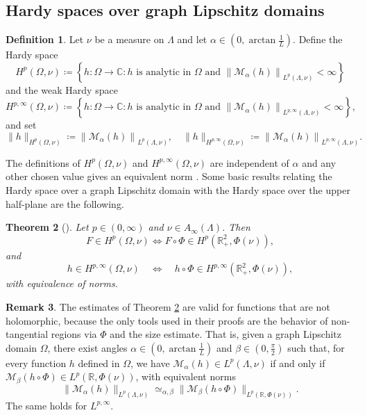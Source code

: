 \documentclass[12pt]{amsart}
\newcommand{\R}{\mathbb{R}}
\theoremstyle{plain}
\newtheorem{theorem}{Theorem}[section]
\theoremstyle{definition}
\newtheorem{definition}[theorem]{Definition}
\newtheorem{remark}[theorem]{Remark}
\numberwithin{equation}{section}
\begin{document}
\subsection{Hardy spaces over graph Lipschitz domains}




\begin{definition}
Let $\nu$ be a measure on $\Lambda$ and let $\alpha\in (0,\arctan{\frac{1}{L}})$. Define the Hardy space 
\[
H^p(\Omega, \nu)
\coloneqq 
\left\{
h: \Omega \rightarrow \mathbb{C}: h \text { is analytic in } \Omega \text { and }\left\|\mathcal{M}_\alpha(h)\right\|_{L^p(\Lambda, \nu)}<\infty
\right\}
\]
and the weak Hardy space
\[
H^{p, \infty}(\Omega, \nu)
\coloneqq 
\left\{
h: \Omega \rightarrow \mathbb{C}: h \text { is analytic in } \Omega \text { and }\left\|\mathcal{M}_\alpha(h)\right\|_{L^{p, \infty}(\Lambda, \nu)}<\infty
\right\},
\]
and set 
\[
\|h\|_{H^p(\Omega, \nu)}
\coloneqq 
\left\|\mathcal{M}_\alpha(h)\right\|_{L^p(\Lambda, \nu)},\quad 
\|h\|_{H^{p, \infty}(\Omega, \nu)}
\coloneqq
\left\|\mathcal{M}_\alpha(h)\right\|_{L^{p, \infty}(\Lambda, \nu)}.
\]    
\end{definition}


The definitions of $H^p(\Omega, \nu)$ and $H^{p, \infty}(\Omega, \nu)$ are independent of $\alpha$ and any other chosen value gives an equivalent norm \cite{kenigWeighted, CNO}. Some basic results relating the Hardy space over a graph Lipschitz domain with the Hardy space over the upper half-plane are the following.

\begin{theorem}[\cite{kenigWeighted, CNO}]\label{thm2.8_Kenig}
    Let $p\in (0,\infty)$ and $\nu\in A_{\infty}(\Lambda)$. Then
    \[
    F\in H^p(\Omega,\nu)
    \iff 
    F\circ\Phi\in H^p(\R_{+}^{2},\Phi(\nu)),
    \]
    and
    \[
    h\in H^{p,\infty}(\Omega,\nu) \quad\iff \quad 
    h\circ\Phi\in H^{p,\infty}(\R_{+}^{2},\Phi(\nu)),
    \]
    with equivalence of norms.
\end{theorem} 

\begin{remark}\label{generalizationThm2.8_Kenig}
    The estimates of Theorem \ref{thm2.8_Kenig} are valid for functions that are not holomorphic, because the only tools used in their proofs are the behavior of non-tangential regions via $\Phi$ and the size estimate. That is, given a graph Lipschitz domain $\Omega$, there exist angles $\alpha\in (0,\arctan{\frac{1}{L}})$ and $\beta\in (0,\frac{\pi}{2})$ such that, for every function $h$ defined in $\Omega$, we have $\mathcal{M}_{\alpha}(h)\in L^p(\Lambda,\nu)$ if and only if $\mathcal{M}_{\beta}(h\circ\Phi)\in L^p(\R,\Phi(\nu))$, with equivalent norms
    \[
    \|\mathcal{M}_{\alpha}(h)\|_{L^p(\Lambda,\nu)}
    \simeq_{\alpha,\beta}
    \|\mathcal{M}_{\beta}(h\circ\Phi)\|_{L^p(\R,\Phi(\nu))}.
    \]
    The same holds for $L^{p,\infty}$.
\end{remark}
\end{document}
